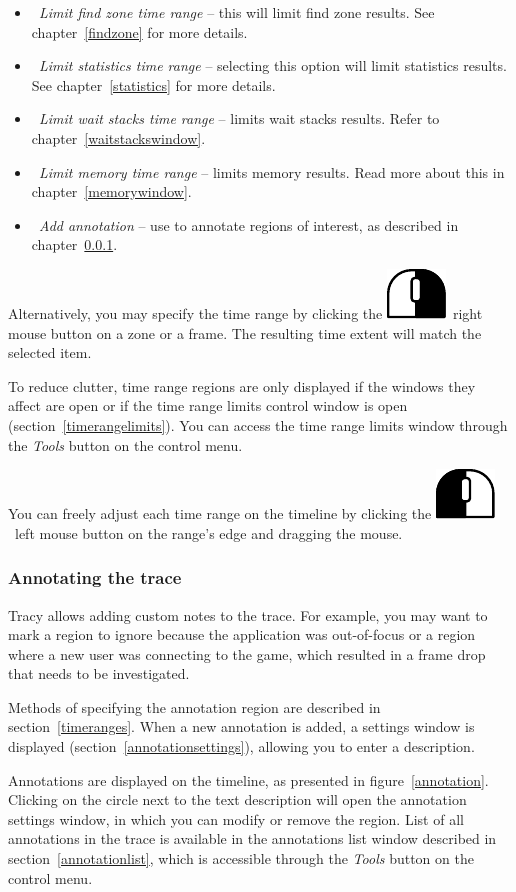 \documentclass[hidelinks,titlepage,a4paper]{article}
\newcommand{\LMB}{\includegraphics[height=.8\baselineskip]{icons/lmb}}
\newcommand{\RMB}{\includegraphics[height=.8\baselineskip]{icons/rmb}}
\begin{document}
\begin{itemize}
\item \emph{\faSearch{}~Limit find zone time range} -- this will limit find zone results. See chapter~\ref{findzone} for more details.
\item \emph{\faSortAmountUp{}~Limit statistics time range} -- selecting this option will limit statistics results. See chapter~\ref{statistics} for more details.
\item \emph{\faHourglassHalf{}~Limit wait stacks time range} -- limits wait stacks results. Refer to chapter~\ref{waitstackswindow}.
\item \emph{\faMemory{}~Limit memory time range} -- limits memory results. Read more about this in chapter~\ref{memorywindow}.
\item \emph{\faStickyNote{}~Add annotation} -- use to annotate regions of interest, as described in chapter~\ref{annotatingtrace}.
\end{itemize}

Alternatively, you may specify the time range by clicking the \RMB{}~right mouse button on a zone or a frame. The resulting time extent will match the selected item.

To reduce clutter, time range regions are only displayed if the windows they affect are open or if the time range limits control window is open (section~\ref{timerangelimits}). You can access the time range limits window through the \emph{\faTools{} Tools} button on the control menu.

You can freely adjust each time range on the timeline by clicking the \LMB{}~left mouse button on the range's edge and dragging the mouse.

\subsubsection{Annotating the trace}
\label{annotatingtrace}

Tracy allows adding custom notes to the trace. For example, you may want to mark a region to ignore because the application was out-of-focus or a region where a new user was connecting to the game, which resulted in a frame drop that needs to be investigated.

Methods of specifying the annotation region are described in section~\ref{timeranges}. When a new annotation is added, a settings window is displayed (section~\ref{annotationsettings}), allowing you to enter a description.

Annotations are displayed on the timeline, as presented in figure~\ref{annotation}. Clicking on the circle next to the text description will open the annotation settings window, in which you can modify or remove the region. List of all annotations in the trace is available in the annotations list window described in section~\ref{annotationlist}, which is accessible through the \emph{\faTools{} Tools} button on the control menu.
\end{document}

